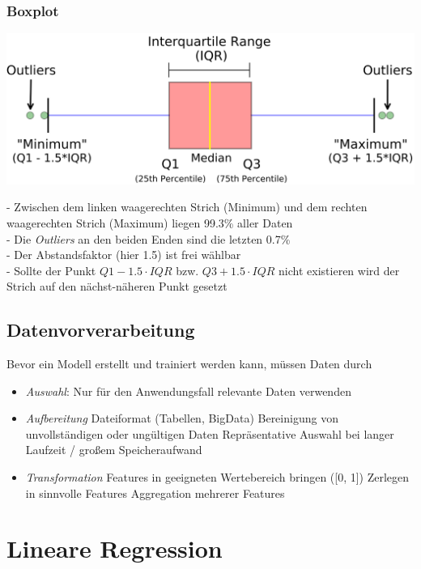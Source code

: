 \documentclass{report}
\begin{document}
  \subsection{Boxplot}	
  \begin{center}	
    \includegraphics[scale=.125]{ml01_8}	
  \end{center}	
  - Zwischen dem linken waagerechten Strich (Minimum) und dem rechten waagerechten Strich (Maximum) liegen 99.3\% aller Daten\\	
  - Die \textit{Outliers} an den beiden Enden sind die letzten 0.7\%\\	
  - Der Abstandsfaktor (hier 1.5) ist frei wählbar\\	
  - Sollte der Punkt $Q1 - 1.5\cdot IQR$ bzw. $Q3 + 1.5\cdot IQR$ nicht existieren wird der Strich auf den nächst-näheren Punkt gesetzt	
  
  \section{Datenvorverarbeitung}	
  Bevor ein Modell erstellt und trainiert werden kann, müssen Daten durch\\	
  \vspace*{-1.5em}	
  \begin{itemize}	
    \item \textit{Auswahl}: Nur für den Anwendungsfall relevante Daten verwenden	
    \item \textit{Aufbereitung}	
    \subitem Dateiformat (Tabellen, BigData)	
    \subitem Bereinigung von unvollständigen oder ungültigen Daten	
    \subitem Repräsentative Auswahl bei langer Laufzeit / großem Speicheraufwand	
    \item \textit{Transformation}	
    \subitem Features in geeigneten Wertebereich bringen ([0, 1])	
    \subitem Zerlegen in sinnvolle Features	
    \subitem Aggregation mehrerer Features	
  \end{itemize}	
  
  \chapter{Lineare Regression}	
\end{document}
